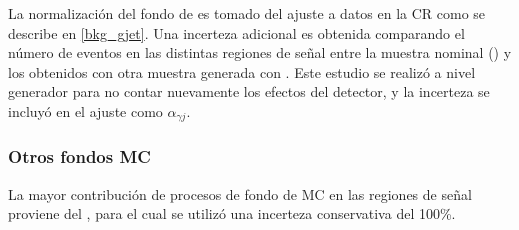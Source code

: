 La normalización del fondo de {\gjet} es tomado del ajuste a datos en la CR
como se describe en \cref{bkg_gjet}. Una incerteza adicional es obtenida comparando el
número de eventos en las distintas regiones de señal entre la muestra nominal
(\sherpa) y los obtenidos con otra muestra generada con {\pythia}.
Este estudio se realizó a nivel generador para no contar nuevamente los efectos del
detector, y la incerteza se incluyó en el ajuste como $\alpha_{\gamma j}$.


\subsubsection{Otros fondos MC}

La mayor contribución de procesos de fondo de MC en las regiones de se\~nal proviene
del {\zgam}, para el cual se utilizó una incerteza conservativa del 100\%.






